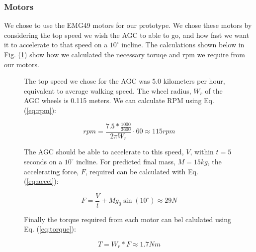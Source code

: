 \documentclass[11pt,landscape]{article}
\begin{document}
\begin{multicols}{3}
\subsubsection{Motors}
We chose to use the EMG49 motors for our prototype. We chose these motors by
considering the top speed we wish the AGC to able to go, and how fast we want it
to accelerate to that speed on a $10^\circ$ incline. The calculations shown
below in Fig. (\ref{fig:motor_calcs}) show how we calculated the necessary
toruqe and rpm we require from our motors.

\begin{figure}[H]
    \begin{mdframed}
        The top speed we chose for the AGC was 5.0 kilometers per hour,
        equivalent to average walking speed. The wheel radius, $W_r$ of the AGC
        wheels is 0.115 meters. We can calculate RPM using Eq. (\ref{eq:rpm}):
        \begin{center}
            \begin{equation}
                rpm = \frac{7.5 * \frac{1000}{3600}}{2\pi W_r} \cdot 60 \approx 115rpm
                \label{eq:rpm}
            \end{equation}
        \end{center}
        The AGC should be able to accelerate to this speed, $V$, within $t=5$
        seconds on a $10^\circ$ incline. For predicted final mass, $M = 15kg$,
        the accelerating force, $F$, required can be calculated with Eq.
        (\ref{eq:accel}):
        \begin{center}
            \begin{equation}
                F = \frac{V}{t} + M g_0 \sin(10^\circ)\approx 29 N
                \label{eq:accel}
            \end{equation}
        \end{center}
        Finally the torque required from each motor can bel calulated using Eq.
        (\ref{eq:torque}):
        \begin{center}
            \begin{equation}
                T = W_r * F \approx 1.7 Nm
                \label{eq:torque} 
            \end{equation}
        \end{center}
    \end{mdframed}
    \label{fig:motor_calcs}
\end{figure}


\end{multicols}
\end{document}
